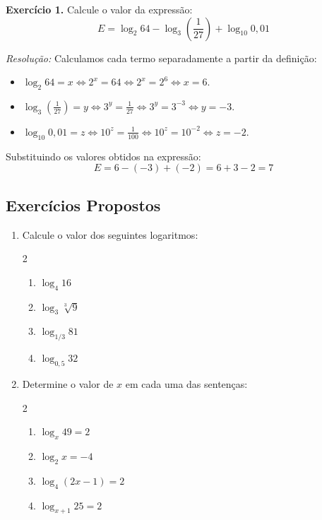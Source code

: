 \documentclass[12pt,a4paper]{report}
\begin{document}
	\textbf{Exercício 1.} Calcule o valor da expressão:
	$$E = \log_2 64 - \log_3 \left(\frac{1}{27}\right) + \log_{10} 0{,}01$$
	
	\textit{Resolução:}
	Calculamos cada termo separadamente a partir da definição:
	\begin{itemize}[label=$\circ$]
		\item $\log_2 64 = x \iff 2^x = 64 \iff 2^x = 2^6 \iff x = 6$.
		\item $\log_3 \left(\frac{1}{27}\right) = y \iff 3^y = \frac{1}{27} \iff 3^y = 3^{-3} \iff y = -3$.
		\item $\log_{10} 0{,}01 = z \iff 10^z = \frac{1}{100} \iff 10^z = 10^{-2} \iff z = -2$.
	\end{itemize}
	Substituindo os valores obtidos na expressão:
	$$E = 6 - (-3) + (-2) = 6 + 3 - 2 = 7$$
	
	\vspace{0.3cm}
		
	\subsection*{Exercícios Propostos}
	
	\begin{enumerate}
		\item Calcule o valor dos seguintes logaritmos:
		\begin{multicols}{2}
			\begin{enumerate}[label=\textbf{\alph*)}]
				\item $\log_4 16$
				\item $\log_3 \sqrt[3]{9}$
				\item $\log_{1/3} 81$
				\item $\log_{0{,}5} 32$
			\end{enumerate}
		\end{multicols}
		
		\item Determine o valor de $x$ em cada uma das sentenças:
		\begin{multicols}{2}
			\begin{enumerate}[label=\textbf{\alph*)}]
				\item $\log_x 49 = 2$
				\item $\log_2 x = -4$
				\item $\log_4 (2x - 1) = 2$
				\item $\log_{x+1} 25 = 2$
			\end{enumerate}
		\end{multicols}
		
	\end{enumerate}
	
\end{document}

